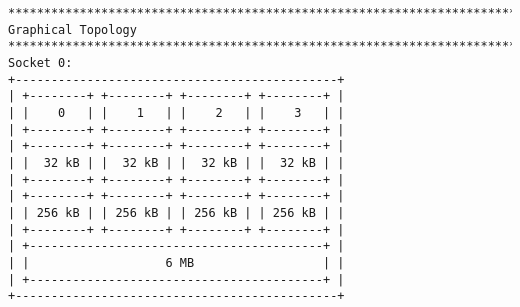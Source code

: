 \documentclass[a4paper, 11pt]{article}
\begin{document}
\begin{verbatim}
********************************************************************************
Graphical Topology
********************************************************************************
Socket 0:
+---------------------------------------------+
| +--------+ +--------+ +--------+ +--------+ |
| |    0   | |    1   | |    2   | |    3   | |
| +--------+ +--------+ +--------+ +--------+ |
| +--------+ +--------+ +--------+ +--------+ |
| |  32 kB | |  32 kB | |  32 kB | |  32 kB | |
| +--------+ +--------+ +--------+ +--------+ |
| +--------+ +--------+ +--------+ +--------+ |
| | 256 kB | | 256 kB | | 256 kB | | 256 kB | |
| +--------+ +--------+ +--------+ +--------+ |
| +-----------------------------------------+ |
| |                   6 MB                  | |
| +-----------------------------------------+ |
+---------------------------------------------+
    \end{verbatim}
\end{document}
